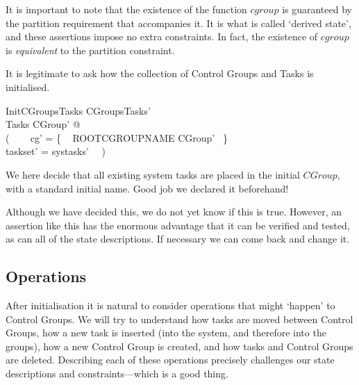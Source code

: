 \documentclass[a4paper,twoside,12pt]{article}
\begin{document}
It is important to note that the existence of the function $cgroup$ is guaranteed by the partition requirement that accompanies it. It is what is called `derived state', and these assertions impose no extra constraints. In fact, the existence of $cgroup$ is \emph{equivalent} to the partition constraint.

It is legitimate to ask how the collection of Control Groups and Tasks is initialised.

\begin{schema}{InitCGroupsTasks}
CGroupsTasks' \\
\Xi Tasks
\where
\exists CGroup' @ \\
( ~~~ cg' = \{ ~ ROOTCGROUPNAME \mapsto \theta CGroup' ~\} \\
\land taskset' = systasks' ~~)
\end{schema}
We here decide that all existing system tasks are placed in the initial $CGroup$, with a standard initial name. Good job we declared it beforehand!

Although we have decided this, we do not yet know if this is true. However, an assertion like this has the enormous advantage that it can be verified and tested, as can all of the state descriptions. If necessary we can come back and change it.

\subsection{Operations}

After initialisation it is natural to consider operations that might `happen' to Control Groups. We will try to understand how tasks are moved between Control Groups, how a new task is inserted (into the system, and therefore into the groups), how a new Control Group is created, and how tasks and Control Groups are deleted. Describing each of these operations precisely challenges our state descriptions and constraints---which is a good thing.

\end{document}

